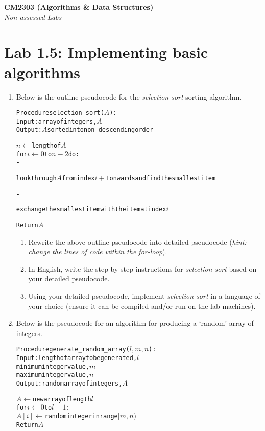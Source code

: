 \documentclass[11pt,a4paper]{report}
\begin{document}
\noindent\Large\textbf{CM2303 (Algorithms \& Data Structures)}\\
\noindent\large\textit{Non-assessed Labs}
\vskip30pt

\section*{Lab 1.5: Implementing basic algorithms}
\begin{enumerate}

\item Below is the outline pseudocode for the \textit{selection sort} sorting algorithm.
    \begin{alltt}
Procedure selection_sort(\(A\)):
    Input:  array of integers, \(A\)
    Output: \(A\) sorted into non-descending order
    
    \(n \gets\) length of \(A\)
    for \(i \gets 0\) to \(n - 2\) do:
        - \begin{normalfont} look through \(A\) from index \(i+1\) onwards and find the smallest item\end{normalfont}
        - \begin{normalfont} exchange the smallest item with the item at index \(i\)\end{normalfont}
    Return \(A\)
\end{alltt}
    
    \begin{enumerate}
        \item Rewrite the above outline pseudocode into detailed pseudocode (\textit{hint: change the lines of code within the for-loop}).
        \item In English, write the step-by-step instructions for \textit{selection sort} based on your detailed pseudocode.
        \item Using your detailed pseudocode, implement \textit{selection sort} in a language of your choice (ensure it can be compiled and/or run on the lab machines).
    \end{enumerate}

\item Below is the pseudocode for an algorithm for producing a `random' array of integers.
    \begin{alltt}
Procedure generate_random_array(\(l, m, n\)):
    Input:  length of array to be generated, \(l\)
            minimum integer value, \(m\)
            maximum integer value, \(n\)
    Output: random array of integers, \(A\)
    
    \(A \gets \) new array of length \(l\)
    for \(i \gets 0\) to \(l - 1\):
         \(A[i] \gets\) random integer in range \([m, n)\)
    Return \(A\)
\end{alltt}
    

\end{enumerate}
\end{document}
